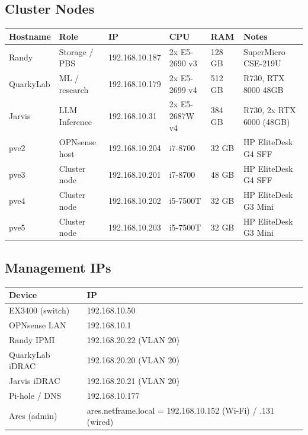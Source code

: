 \documentclass[11pt,letterpaper]{article}
\begin{document}
\subsection{Cluster Nodes}

\begin{longtable}{llllll}
\toprule
\textbf{Hostname} & \textbf{Role} & \textbf{IP} & \textbf{CPU} & \textbf{RAM} & \textbf{Notes} \\
\midrule
\endhead
Randy     & Storage / PBS  & 192.168.10.187 & 2x E5-2690 v3 & 128 GB & SuperMicro CSE-219U \\
QuarkyLab & ML / research  & 192.168.10.179 & 2x E5-2699 v4 & 512 GB & R730, RTX 8000 48GB \\
Jarvis    & LLM Inference  & 192.168.10.31  & 2x E5-2687W v4& 384 GB & R730, 2x RTX 6000 (48GB) \\
pve2      & OPNsense host  & 192.168.10.204 & i7-8700       & 32 GB  & HP EliteDesk G4 SFF \\
pve3      & Cluster node   & 192.168.10.201 & i7-8700       & 48 GB  & HP EliteDesk G4 SFF \\
pve4      & Cluster node   & 192.168.10.202 & i5-7500T      & 32 GB  & HP EliteDesk G3 Mini \\
pve5      & Cluster node   & 192.168.10.203 & i5-7500T      & 32 GB  & HP EliteDesk G3 Mini \\
\bottomrule
\end{longtable}

\subsection{Management IPs}

\begin{tabular}{ll}
\toprule
\textbf{Device} & \textbf{IP} \\
\midrule
EX3400 (switch) & 192.168.10.50 \\
OPNsense LAN    & 192.168.10.1  \\
Randy IPMI      & 192.168.20.22 (VLAN 20) \\
QuarkyLab iDRAC & 192.168.20.20 (VLAN 20) \\
Jarvis iDRAC    & 192.168.20.21 (VLAN 20) \\
Pi-hole / DNS   & 192.168.10.177 \\
Ares (admin)    & ares.netframe.local = 192.168.10.152 (Wi-Fi) / .131 (wired) \\
\bottomrule
\end{tabular}
\end{document}
